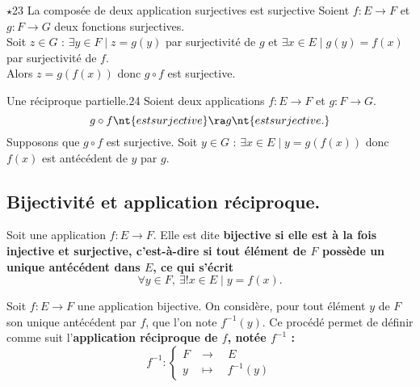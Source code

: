 \documentclass[11pt]{article}
\begin{document}
\begin{prop}{$\star$}{23}
    La composée de deux application surjectives est surjective
    \tcblower
    Soient $f:E\to F$ et $g:F\to G$ deux fonctions surjectives.\\
    Soit $z\in G$ : $\exists y \in F \mid z = g(y)$ par surjectivité de $g$ et $\exists x \in E \mid g(y)=f(x)$ par surjectivité de $f$.\\
    Alors $z=g(f(x))$ donc $g\circ f$ est surjective.
\end{prop}

\begin{prop}{Une réciproque partielle.}{24}
    Soient deux applications $f:E\to F$ et $g:F\to G$.
    \begin{equation*}
        g \circ f \nt{est surjective} \ra g \nt{ est surjective.}
    \end{equation*}
    \tcblower
    Supposons que $g\circ f$ est surjective. Soit $y\in G$ : $\exists x \in E \mid y=g(f(x))$ donc $f(x)$ est antécédent de $y$ par $g$.
\end{prop}

\subsection{Bijectivité et application réciproque.}

\begin{defi}{}{}
    Soit une application $f:E\to F$. Elle est dite \bf{bijective} si elle est à la fois injective et surjective, c'est-à-dire si tout élément de $F$ possède un unique antécédent dans $E$, ce qui s'écrit
    \begin{equation*}
        \forall y \in F, ~ \exists!x\in E \mid y = f(x).
    \end{equation*} 
\end{defi}

\begin{defi}{}{}
    Soit $f:E\to F$ une application bijective. On considère, pour tout élément $y$ de $F$ son unique antécédent par $f$, que l'on note $f^{-1}(y)$. Ce procédé permet de définir comme suit l'\bf{application réciproque} de $f$, notée $f^{-1}$ :
    \begin{equation*}
        f^{-1}:\begin{cases}
            F &\to \quad E\\
            y &\mapsto \quad f^{-1}(y)
        \end{cases}
    \end{equation*}
\end{defi}
\end{document}
